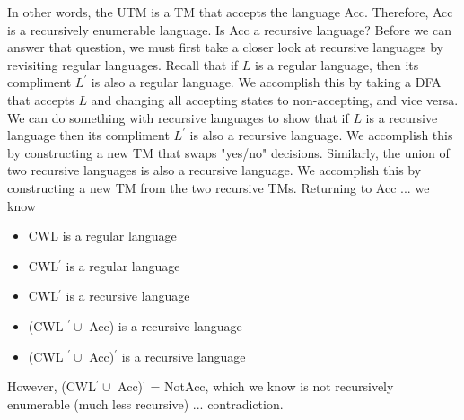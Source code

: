 \documentclass{report}
\begin{document}
\begin{itemize}
\begin{enumerate}
            \end{enumerate}
            \bigbreak \noindent 
            In other words, the UTM is a TM that accepts the language Acc. Therefore, Acc is a recursively enumerable language.
            \bigbreak \noindent 
            Is Acc a recursive language?
            \bigbreak \noindent 
            Before we can answer that question, we must first take a closer look at recursive languages by revisiting regular languages.
            \bigbreak \noindent 
            Recall that if $L$ is a regular language, then its compliment $L^{\prime}$ is also a regular language.
            \bigbreak \noindent 
            We accomplish this by taking a DFA that accepts $L$ and changing all accepting states to non-accepting, and vice versa.
            \bigbreak \noindent 
            We can do something with recursive languages to show that if $L$ is a recursive language then its compliment $L^{\prime}$ is also a recursive language.
            \bigbreak \noindent 
            We accomplish this by constructing a new TM that swaps "yes/no" decisions.
            \bigbreak \noindent 
            \bigbreak \noindent 
            Similarly, the union of two recursive languages is also a recursive language. We accomplish this by constructing a new TM from the two recursive TMs.
            \bigbreak \noindent 
            \bigbreak \noindent 
            Returning to Acc ... we know
            \begin{itemize}
               \item CWL is a regular language
                \item CWL$^{\prime}$ is a regular language
                \item CWL$^{\prime}$ is a recursive language
            \end{itemize}
            \bigbreak \noindent 
            \begin{itemize}
                \item (CWL $^{\prime} \cup $  Acc) is a recursive language
                \item (CWL $^{\prime} \cup $ Acc)$^{\prime}$ is a recursive language 
            \end{itemize}
            \bigbreak \noindent 
            \bigbreak \noindent 
            However, (CWL$^{\prime} \cup $ Acc)$^{\prime}$ = NotAcc, which we know is not recursively enumerable (much less recursive) ... contradiction.

\end{itemize}
\end{document}
